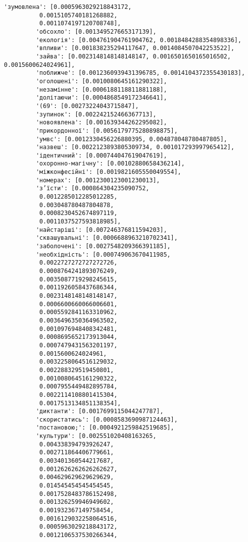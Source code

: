 \documentclass[11pt]{article}
\begin{document}
\begin{Verbatim}[commandchars=\\\{\}]
         'зумовлена': [0.0005963029218843172,
          0.0015105740181268882,
          0.0011074197120708748],
         'обсохло': [0.001349527665317139],
         'екологія': [0.004761904761904762, 0.0018484288354898336],
         'впливи': [0.001838235294117647, 0.0014084507042253522],
         'зайва': [0.0023148148148148147, 0.0016501650165016502, 0.0015600624024961],
         'поближче': [0.0012360939431396785, 0.0014104372355430183],
         'оголошені': [0.0010080645161290322],
         'незамінне': [0.0006188118811881188],
         'долітаючи': [0.0004868549172346641],
         '(69': [0.00273224043715847],
         'зупинок': [0.002242152466367713],
         'новоявлена': [0.001639344262295082],
         'прикордонної': [0.0056179775280898875],
         'умвс': [0.0012330456226880395, 0.004878048780487805],
         'назвеш': [0.0022123893805309734, 0.001017293997965412],
         'ідентичний': [0.000744047619047619],
         'охоронно-магічну': [0.00102880658436214],
         'міжконфесійні': [0.0019821605550049554],
         'номерах': [0.0012300123001230013],
         'з’їсти': [0.000864304235090752,
          0.0012285012285012285,
          0.003048780487804878,
          0.0008230452674897119,
          0.0011037527593818985],
         'найстаріші': [0.007246376811594203],
         'сквашувальні': [0.0006688963210702341],
         'заболочені': [0.0027548209366391185],
         'необхідність': [0.000749063670411985,
          0.0022727272727272726,
          0.0008764241893076249,
          0.0035087719298245615,
          0.0011926058437686344,
          0.0023148148148148147,
          0.0006600660066006601,
          0.0005592841163310962,
          0.0036496350364963502,
          0.0010976948408342481,
          0.0008695652173913044,
          0.0007479431563201197,
          0.0015600624024961,
          0.0032258064516129032,
          0.002288329519450801,
          0.0010080645161290322,
          0.0007955449482895784,
          0.0022114108801415304,
          0.0017513134851138354],
         'диктанти': [0.0017699115044247787],
         'скористатись': [0.0008583690987124463],
         'постановою;': [0.0004921259842519685],
         'культури': [0.002551020408163265,
          0.004338394793926247,
          0.002711864406779661,
          0.003401360544217687,
          0.0012626262626262627,
          0.004629629629629629,
          0.014545454545454545,
          0.0017528483786152498,
          0.001326259946949602,
          0.001932367149758454,
          0.0016129032258064516,
          0.0005963029218843172,
          0.0012106537530266344,

\end{Verbatim}
\end{document}

